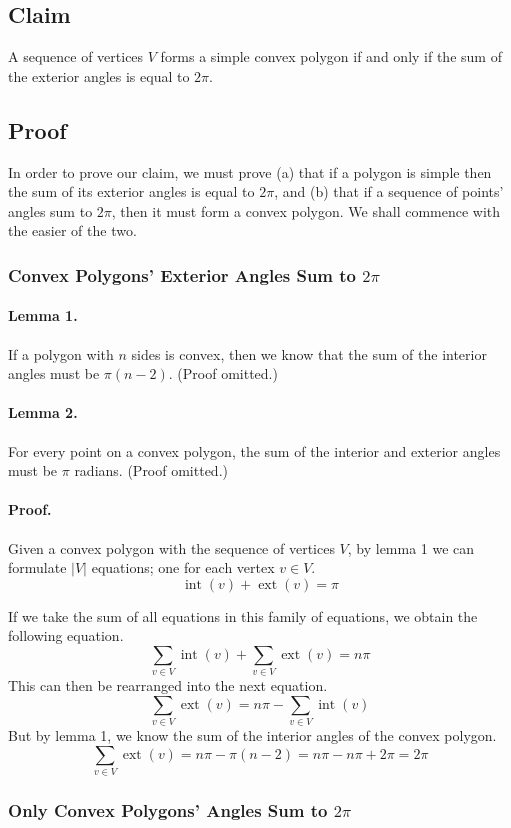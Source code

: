 \documentclass{article}
\newcommand{\inta}[1]{\operatorname{int}\left( #1 \right)} %
\newcommand{\exta}[1]{\operatorname{ext}\left( #1 \right)} %
\begin{document}
\subsection{Claim}

A sequence of vertices \(V\) forms a simple convex polygon if and only if the sum of the exterior angles is equal to \(2\pi\).

\subsection{Proof}

In order to prove our claim, we must prove (a) that if a polygon is simple then the sum of its exterior angles is equal to \(2\pi\), and (b) that if a sequence of points' angles sum to \(2\pi\), then it must form a convex polygon. We shall commence with the easier of the two.

\subsubsection{Convex Polygons' Exterior Angles Sum to \(2\pi\)}

\paragraph{Lemma 1.} If a polygon with \(n\) sides is convex, then we know that the sum of the interior angles must be \(\pi(n - 2)\). (Proof omitted.)

\paragraph{Lemma 2.} For every point on a convex polygon, the sum of the interior and exterior angles must be \(\pi\) radians. (Proof omitted.)

\paragraph{Proof.} Given a convex polygon with the sequence of vertices \(V\), by lemma 1 we can formulate \(|V|\) equations; one for each vertex \(v \in V\).
\begin{equation}
	\inta{v} + \exta{v} = \pi
\end{equation}

If we take the sum of all equations in this family of equations, we obtain the following equation.
\begin{equation}
	\sum_{v \in V} \inta{v} + \sum_{v \in V} \exta{v} = n\pi
\end{equation}
This can then be rearranged into the next equation.
\begin{equation}
	\sum_{v \in V} \exta{v} = n\pi - \sum_{v \in V} \inta{v}
\end{equation}
But by lemma 1, we know the sum of the interior angles of the convex polygon.
\begin{equation}
	\sum_{v \in V} \exta{v} = n\pi - \pi(n-2) = n\pi - n\pi + 2\pi = 2\pi
\end{equation}

\subsubsection{Only Convex Polygons' Angles Sum to \(2\pi\)}
\end{document}
